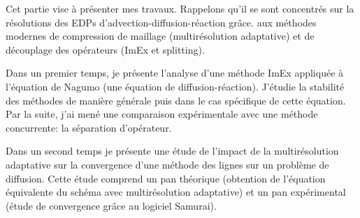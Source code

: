 Cet partie vise à présenter mes travaux. Rappelons qu'il se sont concentrés sur la résolutions des EDPs d'advection-diffusion-réaction grâce. 
aux méthodes modernes de compression de maillage (multirésolution adaptative) et de découplage des opérateurs (ImEx et splitting).\par
Dans un premier temps, je présente l'analyse d'une méthode ImEx appliquée à l'équation de Nagumo (une équation de diffusion-réaction).
J'étudie la stabilité des méthodes de manière générale puis dans le cas spécifique de cette équation. Par la suite, j'ai mené une comparaison expérimentale
avec une méthode concurrente: la séparation d'opérateur.\par
Dans un second temps je présente une étude de l'impact de la multirésolution adaptative sur la convergence d'une méthode des lignes sur un problème de diffusion.
Cette étude comprend un pan théorique (obtention de l'équation équivalente du schéma avec multirésolution adaptative) 
et un pan expérimental (étude de convergence grâce au logiciel Samurai).